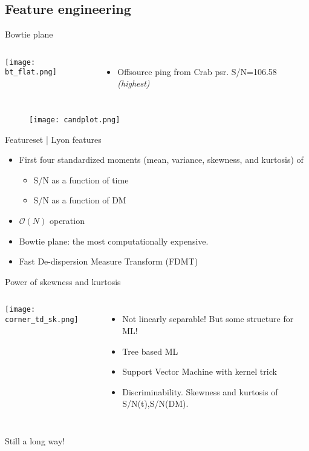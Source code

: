 \subsection{Feature engineering}
\begin{frame}{Bowtie plane}
\begin{columns}[onlytextwidth]
\texttt{[image: bt\_flat.png]}
\begin{itemize}
    \item Offsource ping from Crab psr. S/N=106.58 \emph{(highest)}
\end{itemize}
\end{columns}
\end{frame}

\begin{frame}
	\begin{figure}
	\texttt{[image: candplot.png]}
	\label{fig:candplot}
	\end{figure}
\end{frame}

\begin{frame}[allowframebreaks]{Featureset | Lyon features~\cite{lyon}}
\begin{itemize}
	\item First four standardized moments (mean, variance, skewness, and kurtosis) of \begin{itemize}
			\item S/N as a function of time
			\item S/N as a function of DM
		\end{itemize}
	\item $\mathcal{O}(N)$ operation
	\item Bowtie plane: the most computationally expensive.
	\item Fast De-dispersion Measure Transform (FDMT) \hfill \cite{fdmt}
\end{itemize}
\end{frame}

\begin{frame}{Power of skewness and kurtosis}
\begin{columns}[onlytextwidth]
\texttt{[image: corner\_td\_sk.png]}
\begin{itemize}
    \item Not linearly separable! But some structure for ML!
    \item Tree based ML
    \item Support Vector Machine with kernel trick
    \item Discriminability. Skewness and kurtosis of S/N(t),S/N(DM).
\end{itemize}
\end{columns}
\end{frame}

\begin{frame}
\vspace{\vfill}
{\Huge Still a long way!}
\vspace{\vfill}
\end{frame}
